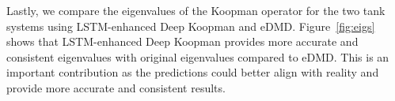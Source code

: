 \documentclass[conference]{IEEEtran}
\begin{document}

Lastly, we compare the eigenvalues of the Koopman operator for the two tank systems using LSTM-enhanced Deep Koopman and eDMD\@. Figure~\ref{fig:eigs} shows that LSTM-enhanced Deep Koopman provides more accurate and consistent eigenvalues with original eigenvalues compared to eDMD\@. This is an important contribution as the predictions could better align with reality and provide more accurate and consistent results.
\end{document}
